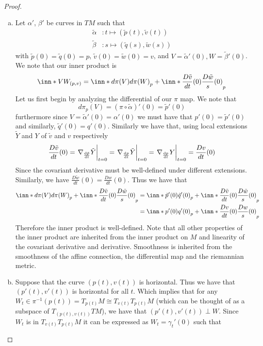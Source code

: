 \documentclass[a4paper]{article}
\begin{document}
  \begin{proof}
    \begin{enumerate}[a)]
      \item Let $\alpha'$, $\beta'$ be curves in $TM$ such that 
        \[
          \begin{aligned}
            \tilde{\alpha}&: t \mapsto (\tilde{p}(t), \tilde{v}(t)) \\
            \tilde{\beta}&: s \mapsto (\tilde{q}(s), \tilde{w}(s))
          \end{aligned}
        \]
        with $\tilde{p}(0) = \tilde{q}(0) = p$, $\tilde{v}(0) = \tilde{w}(0) = v$, and $V = \tilde{\alpha}'(0), W = \tilde{\beta}'(0)$. We note that our inner product is
        \[
          \inn*{V}{W}_{(p,v)} =  \inn*{d\pi(V)}{d\pi(W)}_p + \inn*{ \frac{D\tilde{v}}{dt}(0)}{\frac{D\tilde{w}}{s}(0)}_p
        \]
        Let us first begin by analyzing the differential of our $\pi$ map. We note that 
        \[
          d\pi_p(V) = (\pi \circ \tilde{\alpha})'(0) = \tilde{p}'(0)
        \]
        furthermore since $V = \tilde{\alpha}'(0) = \alpha'(0)$ we must have that $p'(0) = \tilde{p}'(0)$ and similarly, $\tilde{q}'(0) = q'(0)$. Similarly we have that, using local extensions $\tilde{Y}$ and $Y$ of $\tilde{v}$ and $v$ respectively
        \[
          \frac{D\tilde{v}}{dt}(0) = \eval{\nabla_{\dv{\tilde{p}}{t}} \tilde{Y}}_{t = 0} = \eval{\nabla_{\dv{p}{t}}\tilde{Y}}_{t=0} = \eval{\nabla_{\dv{p}{t}}Y}_{t=0} = \frac{Dv}{dt}(0)
        \]
        Since the covariant derivative must be well-defined under different extensions. Similarly, we have $\frac{D\tilde{w}}{dt}(0) = \frac{Dw}{dt}(0)$. Thus we have that
        \[
          \begin{aligned}
            \inn*{d\pi(V)}{d\pi(W)}_p + \inn*{ \frac{D\tilde{v}}{dt}(0)}{\frac{D\tilde{w}}{s}(0)}_p  &= \inn*{\tilde{p}'(0)}{\tilde{q}'(0)}_p + \inn*{ \frac{D\tilde{v}}{dt}(0)}{\frac{D\tilde{w}}{s}(0)}_p  \\
            &= \inn*{{p}'(0)}{{q}'(0)}_p + \inn*{ \frac{Dv}{dt}(0)}{\frac{Dw}{s}(0)}_p  \\
          \end{aligned}
        \]
        Therefore the inner product is well-defined. Note that all other properties of the inner product are inherited from the inner product on $M$ and linearity of the covariant derivative and derivative. Smoothness is inherited from the smoothness of the affine connection, the differential map and the riemannian metric.
      \item Suppose that the curve $(p(t), v(t))$ is horizontal. Thus we have that $(p'(t), v'(t))$ is horizontal for all $t$. Which implies that for any $W_t \in \pi^{-1}(p(t)) = T_{p(t)}M \cong T_{v(t)}T_{p(t)}M$ (which can be thought of as a subspace of $T_{(p(t),v(t))}TM$), we have that $(p'(t), v'(t)) \perp W$. Since $W_t$ is in $T_{v(t)}T_{p(t)}M$ it can be expressed as $W_t = \gamma_t'(0)$ such that

\end{enumerate}
\end{proof}
\end{document}

